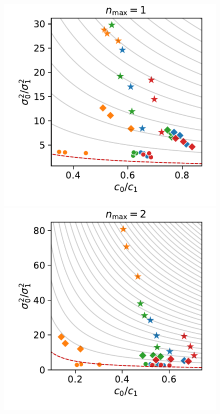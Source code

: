 \begin{figure}[tb]
    \centering
    \hfill
    \begin{minipage}{\textwidth}
    \includegraphics[scale=.5]{gfx/eff_landscape_order1.pdf}
    \includegraphics[scale=.5]{gfx/eff_landscape_order2.pdf}

\end{minipage}
\end{figure}
